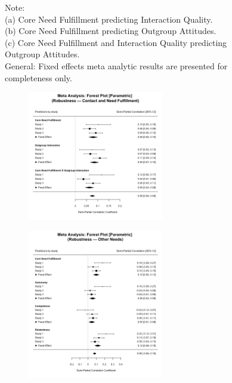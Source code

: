 \documentclass[man, 12pt, a4paper]{apa7}
\theoremstyle{break}
\theoremstyle{plain}
\begin{document}
\begin{figure}
\begin{subfigure}{\textwidth}
  \end{subfigure}
  \caption*{Note: \\
  (a) Core Need Fulfillment predicting Interaction Quality.\\
  (b) Core Need Fulfillment predicting Outgroup Attitudes.\\
  (c) Core Need Fulfillment and Interaction Quality predicting Outgroup Attitudes.\\
  General: Fixed effects meta analytic results are presented for completeness only.}
\end{figure}

\begin{figure}
  \caption{Robustness Analyses}
  \begin{subfigure}{\textwidth}
    \caption{}
    \centering\includegraphics[width=0.65\textwidth]{Figures/forestParametricFERobustContact.png}
  \end{subfigure}
  \begin{subfigure}{\textwidth}
    \caption{}
    \centering\includegraphics[width=0.65\textwidth]{Figures/forestParametricFERobustSDT.png}

\end{subfigure}
\end{figure}
\end{document}
